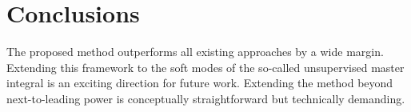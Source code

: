 \section{Conclusions}\label{sec:conclusions}

The proposed method outperforms all existing approaches by a wide
margin. Extending this framework to the soft modes of the so-called
unsupervised master integral is an exciting direction for future work.
Extending the method beyond next-to-leading power is conceptually
straightforward but technically demanding.

